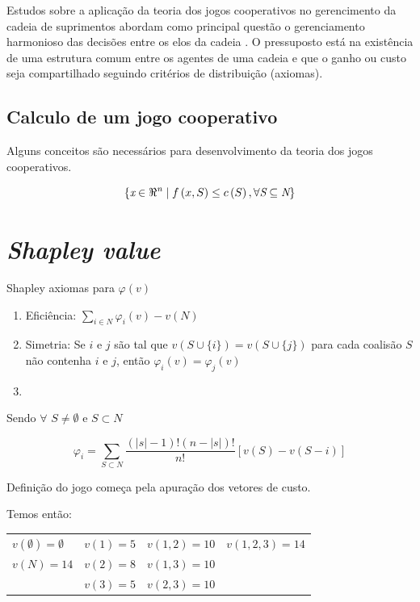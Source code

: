 \documentclass[
	article,			        %
	11pt,				          %
	oneside,			        %
	a4paper,			        %
	english,			        %
	brazil,				        %
	sumario=tradicional
]{abntex2}\usepackage[]{graphicx}\usepackage[]{color}
\begin{document}
Estudos sobre a aplicação da teoria dos jogos cooperativos no gerencimento da cadeia de suprimentos abordam como principal questão o gerenciamento harmonioso das decisões entre os elos da cadeia \cite{Dobos.2010a}. O pressuposto está na existência de uma estrutura comum entre os agentes de uma cadeia e que o ganho ou custo seja compartilhado seguindo critérios de distribuição (axiomas)\cite{Bezerra.2009}.

\subsection{Calculo de um jogo cooperativo}

Alguns conceitos são necessários para desenvolvimento da teoria dos jogos cooperativos.

\begin{equation}
  \label{eq:conceitoTJC}
  \left \{ 
    \emph{x} \in \Re^{\emph{n}} \mid f\left ( x,S \right ) \leq c\left ( S \right ), \forall \emph{S} \subseteq \emph{N}
  \right\}
\end{equation}

\section{\emph{Shapley value}}

Shapley axiomas para $\varphi(v)$
\begin{enumerate}
  \item Eficiência: $\sum_{i \in N} \varphi_i(v) - v(N)$
  \item Simetria: Se $i$ e $j$ são tal que $v(S \cup \{i\}) = v(S \cup \{j\})$ para cada coalisão $S$ não contenha $i$ e $j$, então $\varphi_i (v) = \varphi_j (v)$
  \item 
\end{enumerate}

Sendo $\forall$ $S \neq \emptyset$ e $S \subset N$

\begin{equation}
  \label{eq:shaVal}
  \varphi _{i} = \sum_{S \subset N} \frac{(|s| - 1)!(n - |s|)!}{n!}[v(S)-v(S - i)]
\end{equation}

Definição do jogo começa pela apuração dos vetores de custo.

Temos então:

\begin{table}[!h]
  \centering
  \label{my-label}
  \begin{tabular}{llll}
    $v(\emptyset) = \emptyset$ & $v(1) = 5$ & $v(1, 2) = 10$ & $v(1, 2, 3) = 14$ \\
    $v(N) = 14$                & $v(2) = 8$ & $v(1, 3) = 10$ &                   \\
                               & $v(3) = 5$ & $v(2, 3) = 10$ &                  
  \end{tabular}
\end{table}
\end{document}
